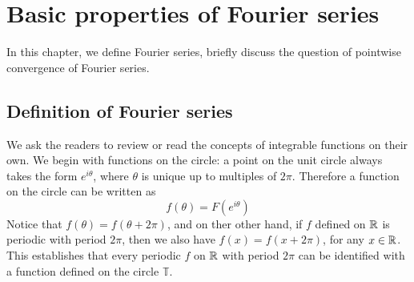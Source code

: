 \chapter{Basic properties of Fourier series}

In this chapter, we define Fourier series, briefly discuss the question of pointwise convergence of Fourier series.

\section{Definition of Fourier series}
We ask the readers to review or read the concepts of integrable functions on their own. We begin with functions on the circle: a point on the unit circle always takes the form $e^{i\theta}$, where $\theta$ is unique up to multiples of $2\pi$. Therefore a function on the circle can be written as 
\begin{equation*}
    f(\theta)=F(e^{i\theta})
\end{equation*}
Notice that $f(\theta)=f(\theta+2\pi)$, and on ther other hand, if $f$ defined on $\mathbb{R}$ is periodic with period $2\pi$, then we also have $f(x)=f(x+2\pi)$, for any $x\in\mathbb{R}$. This establishes that every periodic $f$ on $\mathbb{R}$ with period $2\pi$ can be identified with a function defined on the circle $\mathbb{T}$.


